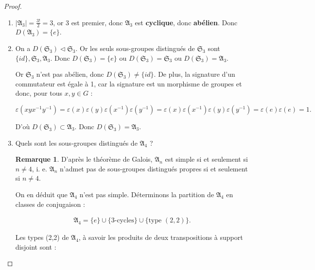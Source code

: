 \documentclass[french]{book}
\theoremstyle{definition}
\newtheorem*{protoremark}{Remarque}
\newenvironment{remark}
    {\colorlet{shadecolor}{yellow!5}\begin{shaded}\begin{protoremark}}
    {\end{protoremark}\end{shaded}}
\begin{document}
\begin{proof}

  \

  \begin{enumerate}
    \item \(\left\lvert \mathfrak{A}_3 \right\rvert = \frac{3!}{2}=3\), or 3 est premier, donc \(\mathfrak{A}_3\) est \textbf{cyclique}, donc \textbf{abélien}. Donc \(D(\mathfrak{A}_{3}) = \{ e \}\).
    \item On a \(D(\mathfrak{S}_{3}) \triangleleft \mathfrak{S}_3\). Or les seuls sous-groupes distingués de \(\mathfrak{S}_{3}\) sont \(\{ id \}, \mathfrak{S}_{3}, \mathfrak{A}_3\). Donc \(D(\mathfrak{S}_{3}) = \{ e \} \text{ ou } D(\mathfrak{S}_{3}) = \mathfrak{S}_{3} \text{ ou } D(\mathfrak{S}_{3}) = \mathfrak{A}_{3}\).

    Or \(\mathfrak{S}_{3}\) n'est pas abélien, donc \(D(\mathfrak{S}_{3}) \neq \{ id \}\). De plus, la signature d'un commutateur est égale à 1, car la signature est un morphisme de groupes et donc, pour tous \(x, y \in G\) :

    \[\varepsilon(x y x ^{-1} y ^{-1}) = \varepsilon(x) \varepsilon(y) \varepsilon(x ^{-1}) \varepsilon(y ^{-1}) = \varepsilon(x) \varepsilon(x ^{-1}) \varepsilon(y) \varepsilon(y ^{-1}) = \varepsilon(e)\varepsilon(e) = 1.\]

    D'où \(D(\mathfrak{S}_{3}) \subset \mathfrak{A}_3\). Donc \(D(\mathfrak{S}_{3}) = \mathfrak{A}_3\).

    \item Quels sont les sous-groupes distingués de \(\mathfrak{A}_{4}\) ?

    \begin{remark}
      D'après le théorème de Galois, \(\mathfrak{A}_n\) est simple si et seulement si \(n \neq 4\), i. e. \(\mathfrak{A}_n\) n'admet pas de sous-groupes distingués propres si et seulement si \(n \neq 4\).
    \end{remark}

    On en déduit que \(\mathfrak{A}_4\) n'est pas simple. Déterminons la partition de \(\mathfrak{A}_4\) en classes de conjugaison :

    \begin{gather*}
      \mathfrak{A}_4 = \{ e \} \cup \{ 3\text{-cycles} \} \cup \{ \text{type } (2, 2)\}.
    \end{gather*}

    Les types (2,2) de \(\mathfrak{A}_{4}\), à savoir les produits de deux transpositions à support disjoint sont :


\end{enumerate}
\end{proof}
\end{document}
